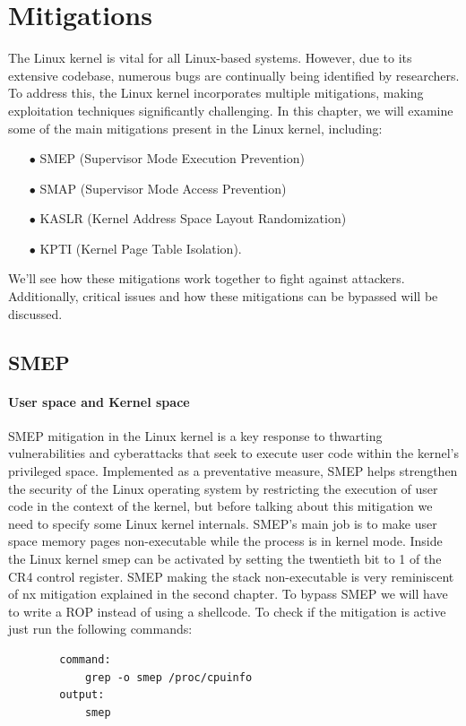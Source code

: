     \section{Mitigations}
    The Linux kernel is vital for all Linux-based systems. However, due to its extensive codebase, numerous bugs are continually being identified by researchers. To address this, the Linux kernel incorporates multiple mitigations, making exploitation techniques significantly challenging.\newline
    In this chapter, we will examine some of the main mitigations present in the Linux kernel, including:
    \begin{itemize}
        \item[$\bullet$] SMEP (Supervisor Mode Execution Prevention)
        \item[$\bullet$] SMAP (Supervisor Mode Access Prevention) 
        \item[$\bullet$] KASLR (Kernel Address Space Layout Randomization)   
        \item[$\bullet$] KPTI (Kernel Page Table Isolation).\newline 
    \end{itemize}
    We'll see how these mitigations work together to fight against attackers.\newline
    Additionally, critical issues and how these mitigations can be bypassed will be discussed.\newline
    \subsection{SMEP}

    \paragraph{User space and Kernel space}

   SMEP mitigation in the Linux kernel is a key response to thwarting vulnerabilities and cyberattacks that seek to execute user code within the kernel's privileged space. Implemented as a preventative measure, SMEP helps strengthen the security of the Linux operating system by restricting the execution of user code in the context of the kernel, but before talking about this mitigation we need to specify some Linux kernel internals.\newline
    SMEP's main job is to make user space memory pages non-executable while the process is in kernel mode. Inside the Linux kernel smep can be activated by setting the twentieth bit to 1 of the CR4 control register.\newline
    SMEP making the stack non-executable is very reminiscent of nx mitigation explained in the second chapter.\newline
    To bypass SMEP we will have to write a ROP instead of using a shellcode.\newline 
    To check if the mitigation is active just run the following commands: \newline
        \begin{verbatim}
        command:
            grep -o smep /proc/cpuinfo
        output: 
            smep
    \end{verbatim}
